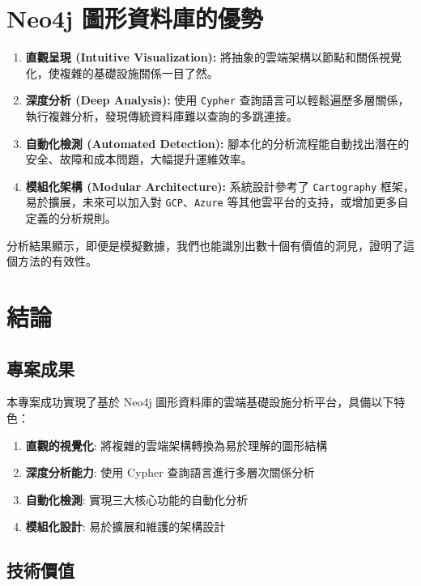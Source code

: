 \documentclass[11pt,a4paper]{ctexart}
\begin{document}
\section{Neo4j 圖形資料庫的優勢}

\begin{enumerate}[leftmargin=1.5em]
\item \textbf{直觀呈現 (Intuitive Visualization):} 將抽象的雲端架構以節點和關係視覺化，使複雜的基礎設施關係一目了然。

\item \textbf{深度分析 (Deep Analysis):} 使用 \texttt{Cypher} 查詢語言可以輕鬆遍歷多層關係，執行複雜分析，發現傳統資料庫難以查詢的多跳連接。

\item \textbf{自動化檢測 (Automated Detection):} 腳本化的分析流程能自動找出潛在的安全、故障和成本問題，大幅提升運維效率。

\item \textbf{模組化架構 (Modular Architecture):} 系統設計參考了 \texttt{Cartography} 框架，易於擴展，未來可以加入對 \texttt{GCP}、\texttt{Azure} 等其他雲平台的支持，或增加更多自定義的分析規則。
\end{enumerate}

分析結果顯示，即便是模擬數據，我們也能識別出數十個有價值的洞見，證明了這個方法的有效性。

\section{結論}

\subsection{專案成果}

本專案成功實現了基於 Neo4j 圖形資料庫的雲端基礎設施分析平台，具備以下特色：

\begin{enumerate}[leftmargin=1.5em]
\item \textbf{直觀的視覺化}: 將複雜的雲端架構轉換為易於理解的圖形結構
\item \textbf{深度分析能力}: 使用 Cypher 查詢語言進行多層次關係分析
\item \textbf{自動化檢測}: 實現三大核心功能的自動化分析
\item \textbf{模組化設計}: 易於擴展和維護的架構設計
\end{enumerate}

\subsection{技術價值}
\end{document}

